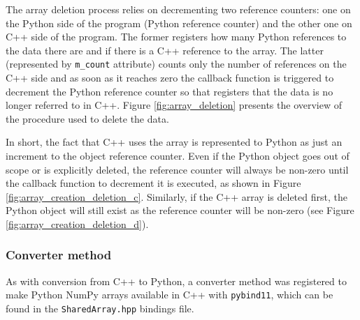 The array deletion process relies on decrementing two reference counters: one 
on the Python side of the program (Python reference counter) and the other one 
on C++ side of the program. The former registers how many Python references to 
the data there are and if there is a C++ reference to the array. The latter 
(represented by \texttt{m\_count} attribute) counts only the number of references 
on the C++ side and as soon as it reaches zero the callback function is triggered to 
decrement the Python reference counter so that registers that the data is no longer 
referred to in C++. Figure \ref{fig:array_deletion} presents the overview of the 
procedure used to delete the data.

In short, the fact that C++ uses the array is represented to Python as just an 
increment to the object reference counter. Even if the Python object goes out 
of scope or is explicitly deleted, the reference counter will always be non-zero 
until the callback function to decrement it is executed, as shown in Figure 
\ref{fig:array_creation_deletion_c}. Similarly, if the C++ array is deleted first, 
the Python object will still exist as the reference counter will be non-zero 
(see Figure \ref{fig:array_creation_deletion_d}).

\subsubsection{Converter method}

As with conversion from C++ to Python, a converter method was registered to make
Python NumPy arrays available in C++ with \texttt{pybind11}, which can be found in
the \texttt{SharedArray.hpp} bindings file.

